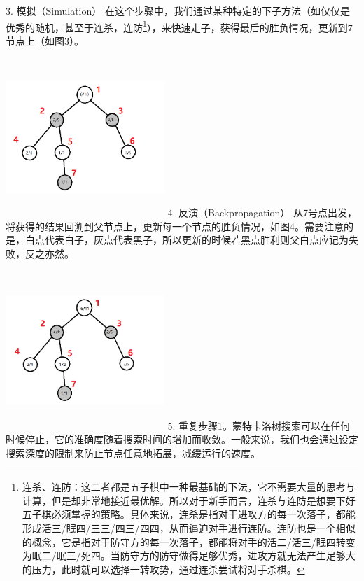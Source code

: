 \documentclass[a4paper]{article}
\begin{document}
\begin{multicols}{2}
3.	模拟（Simulation）
在这个步骤中，我们通过某种特定的下子方法（如仅仅是优秀的随机，甚至于连杀，连防\footnote{连杀、连防：这二者都是五子棋中一种最基础的下法，它不需要大量的思考与计算，但是却非常地接近最优解。所以对于新手而言，连杀与连防是想要下好五子棋必须掌握的策略。具体来说，连杀是指对于进攻方的每一次落子，都能形成活三/眠四/三三/四三/四四，从而逼迫对手进行连防。连防也是一个相似的概念，它是指对于防守方的每一次落子，都能将对手的活二/活三/眠四转变为眠二/眠三/死四。当防守方的防守做得足够优秀，进攻方就无法产生足够大的压力，此时就可以选择一转攻势，通过连杀尝试将对手杀棋。}），来快速走子，获得最后的胜负情况，更新到7节点上（如图3）。\par
\includegraphics[width=6cm,height=6cm]{k3.png}
4.	反演（Backpropagation）
从7号点出发，将获得的结果回溯到父节点上，更新每一个节点的胜负情况，如图4。需要注意的是，白点代表白子，灰点代表黑子，所以更新的时候若黑点胜利则父白点应记为失败，反之亦然。\par
\includegraphics[width=6cm,height=6cm]{k4.png}
5.	重复步骤1。蒙特卡洛树搜索可以在任何时候停止，它的准确度随着搜索时间的增加而收敛。一般来说，我们也会通过设定搜索深度的限制来防止节点任意地拓展，减缓运行的速度。\par

\end{multicols}
\end{document}
